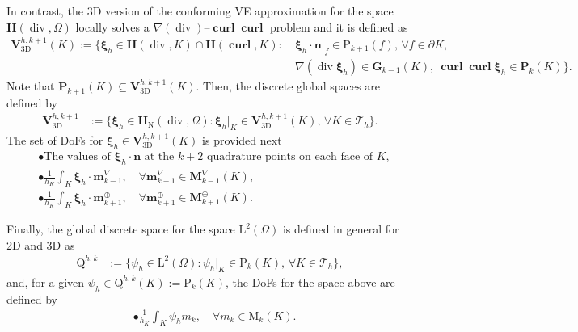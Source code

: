 \documentclass[fleqn,a4paper]{cas-sc}
\newcommand\vdiv{\mathop{\mathrm{div}}\nolimits}
\newcommand\bcurl{\mathop{\mathbf{curl}}\nolimits}
\newcommand{\bn}{\boldsymbol{n}}
\newcommand{\bm}{\mathbf{m}}
\newcommand{\bxi}{\boldsymbol{\xi}}
\newcommand{\0}{\boldsymbol{0}}
\newcommand\cT{\mathcal{T}}
\newcommand\bP{\mathbf{P}}
\newcommand\bG{\mathbf{G}}
\newcommand\bM{\mathbf{M}}
\newcommand\bV{\mathbf{V}}
\newcommand\rP{\mathrm{P}}
\newcommand\rM{\mathrm{M}}
\newcommand\bH{\mathbf{H}}
\newcommand\rL{\mathrm{L}}
\numberwithin{equation}{section}
\numberwithin{figure}{section}
\begin{document}
In contrast, the 3D version of the conforming VE approximation for the space $\bH(\vdiv,\Omega)$ locally solves a $\nabla(\vdiv)$--$\bcurl\bcurl$ problem \cite{beirao16b} and it is defined as
\begin{align*}
    \bV_{\text{3D}}^{h,k+1}(K) := \{ \bxi_h \in \bH(\vdiv,K)\cap \bH(\bcurl,K) \colon\ &\bxi_h \cdot \bn|_{{f}} \in \rP_{k+1}(f),\, \forall f\in \partial K, \\
    & \nabla (\vdiv \bxi_h) \in \bG_{k-1}(K),\ \bcurl\bcurl \bxi_h \in \bP_{k}(K)\}.
\end{align*}
Note that $\bP_{k+1}(K)\subseteq\bV_{\text{3D}}^{h,k+1}(K)$. Then, the discrete global spaces are defined by
\begin{align*}
    \bV_{\text{3D}}^{h,k+1} &:= \{ \bxi_h \in \bH_{\mathrm{N}}(\vdiv,\Omega) \colon \bxi_h|_K \in \bV_{\text{3D}}^{h,k+1}(K) ,\, \forall K\in \cT_h \}.
\end{align*}
The set of DoFs for $\bxi_h\in \bV_{\text{3D}}^{h,k+1}(K)$ is provided next
\begin{align*}
    &\bullet \text{The values of } \bxi_h\cdot \bn \text{ at the $k+2$ quadrature points on each face of $K$}, \\
    &\bullet \frac{1}{h_K}\int_K \bxi_h\cdot \bm_{k-1}^\nabla ,\quad \forall \bm_{k-1}^{\nabla} \in \bM_{k-1}^{\nabla}(K),\\
    &\bullet \frac{1}{h_K}\int_K \bxi_h \cdot \bm_{k+1}^{\oplus} ,\quad \forall \bm_{k+1}^{\oplus} \in \bM_{k+1}^{\oplus}(K).
\end{align*}

Finally, the global discrete space for the space $\rL^2(\Omega)$ is defined in general for 2D and 3D as
\begin{align*}
    \mathrm{Q}^{h,k} &:= \{ \psi_h\in \rL^2(\Omega) \colon \psi_h|_K\in \rP_{k}(K) ,\, \forall K\in \cT_h \},
\end{align*}
and, for a given $\psi_h\in \mathrm{Q}^{h,k}(K):=\rP_{k}(K)$, the DoFs for the space above are defined by
\begin{align*}
    &\bullet \frac{1}{h_K}\int_K \psi_h m_{k} ,\quad  \forall m_{k}\in \rM_{k}(K).
\end{align*}
\end{document}
